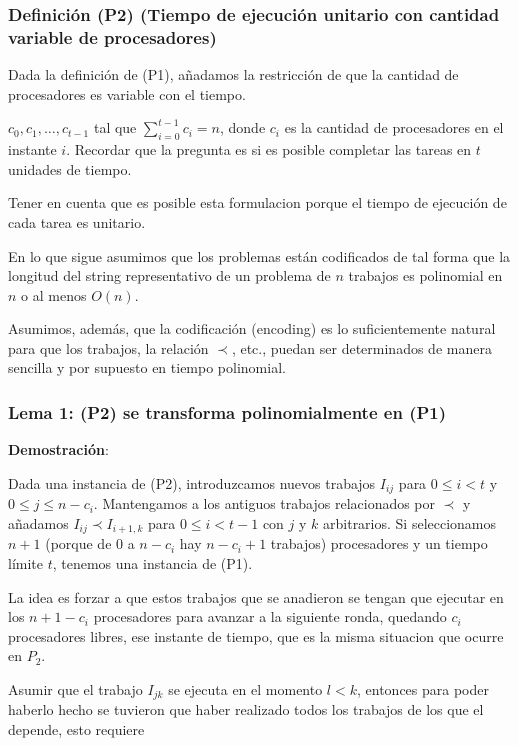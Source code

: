 \documentclass[14pt]{extarticle}
\begin{document}
\subsubsection*{Definición (P2) (Tiempo de ejecución unitario con cantidad variable de procesadores)}

Dada la definición de (P1), añadamos la restricción de que la cantidad de procesadores es variable con el tiempo. 

$c_0, c_1, \ldots, c_{t-1}$ tal que $\sum_{i = 0}^{t-1} c_i = n$, donde $c_i$ es la cantidad de procesadores en el instante $i$. Recordar que la pregunta es si es posible completar las tareas en $t$ unidades de tiempo. 

Tener en cuenta que es posible esta formulacion porque el tiempo de ejecución de cada tarea es unitario. 

En lo que sigue asumimos que los problemas están codificados de tal forma que la longitud del string representativo de un problema de $n$ trabajos es polinomial en $n$ o al menos $O(n)$. 

Asumimos, además, que la codificación (encoding) es lo suficientemente natural para que los trabajos, la relación $\prec$, etc., puedan ser determinados de manera sencilla y por supuesto en tiempo polinomial.

\subsubsection*{Lema 1: (P2) se transforma polinomialmente en (P1)}

\textbf{Demostración}:

Dada una instancia de (P2), introduzcamos nuevos trabajos $I_{ij}$ para $0 \leq i < t$ y $0 \leq j \leq n - c_i$. Mantengamos a los antiguos trabajos relacionados por $\prec$ y añadamos $I_{ij} \prec I_{i+1, k}$ para $0 \leq i < t - 1$ con $j$ y $k$ arbitrarios. Si seleccionamos $n + 1$ (porque de $0$ a $n - c_i$ hay $n - c_i + 1$ trabajos) procesadores y un tiempo límite $t$, tenemos una instancia de (P1).

La idea es forzar a que estos trabajos que se anadieron se tengan que ejecutar en los $n +1 - c_i$ procesadores para avanzar a la siguiente ronda, quedando $c_i$ procesadores libres, ese instante de tiempo, que es la misma situacion que ocurre en $P_2$.

Asumir que el trabajo $I_{jk}$ se ejecuta en el momento $l < k$, entonces para poder haberlo hecho se tuvieron que haber realizado todos los trabajos de los que el depende, esto requiere 
\end{document}
